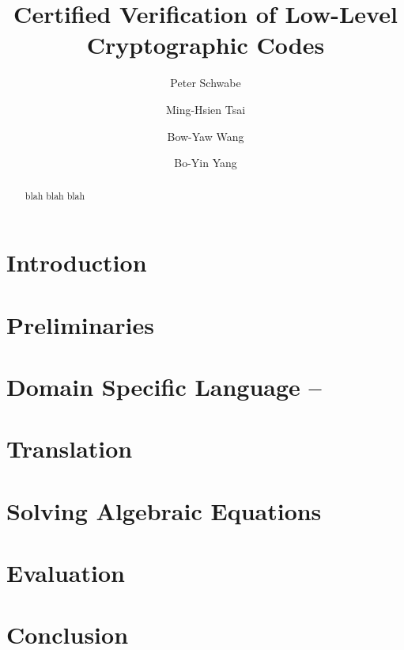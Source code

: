 \documentclass{llncs}
\title{Certified Verification of Low-Level Cryptographic Codes}
\author{
Peter Schwabe\inst{2}
\and
Ming-Hsien Tsai\inst{1}
\and
Bow-Yaw Wang\inst{1}
\and
Bo-Yin Yang\inst{1}
%
}
\institute
{
Institute of Information Science\\
Academia Sinica\\
128 Section 2 Academia Road, Taipei 115-29, Taiwan\\
\email{mhtsai208@gmail.com, bywang@iis.sinica.edu.tw, by@crypto.tw}
\and
Radboud University Nijmegen\\
Digital Security Group\\
PO Box 9010, 6500GL Nijmegen, The Netherlands\\
\email{peter@cryptojedi.org}
}
\author{\vspace*{-1cm} }
\institute{\vspace*{-1cm}\ }
\begin{document}
\maketitle

\begin{abstract}
  blah blah blah
\end{abstract}

\section{Introduction}
\label{section:introduction}


\section{Preliminaries}
\label{section:preliminaries}


\section{Domain Specific Language -- }
\label{section:domain-specific-language}


\section{Translation}
\label{section:translation}


\section{Solving Algebraic Equations}
\label{section:solving-algebraic-equations}


\section{Evaluation}
\label{section:evaluation}


\section{Conclusion}
\label{section:conclusion}



%


\end{document}
